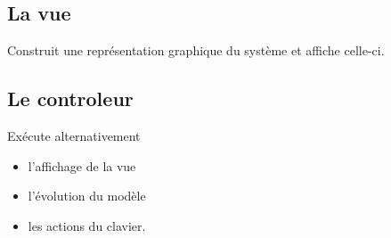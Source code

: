 \subsection{La vue}
Construit une représentation graphique du système et affiche celle-ci.
%
\subsection{Le controleur}
Exécute alternativement 
\begin{itemize}[leftmargin=2cm]
\item l'affichage de la vue
\item l'évolution du modèle
\item les actions du clavier.
\end{itemize}
%
